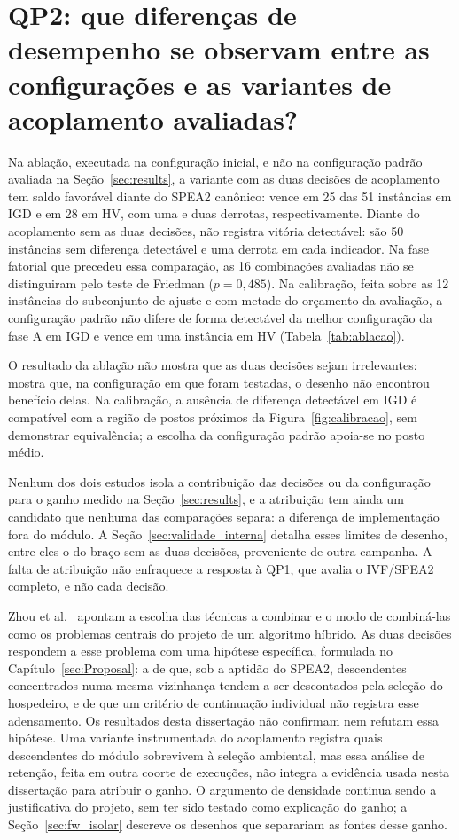 \section{QP2: que diferenças de desempenho se observam entre as configurações e as variantes de acoplamento avaliadas?}
\label{sec:resposta_qp2}

Na ablação, executada na configuração inicial, e não na configuração padrão avaliada na Seção~\ref{sec:results}, a variante com as duas decisões de acoplamento tem saldo favorável diante do SPEA2 canônico: vence em 25 das 51 instâncias em IGD e em 28 em HV, com uma e duas derrotas, respectivamente. Diante do acoplamento sem as duas decisões, não registra vitória detectável: são 50 instâncias sem diferença detectável e uma derrota em cada indicador. Na fase fatorial que precedeu essa comparação, as 16 combinações avaliadas não se distinguiram pelo teste de Friedman ($p = 0{,}485$). Na calibração, feita sobre as 12 instâncias do subconjunto de ajuste e com metade do orçamento da avaliação, a configuração padrão não difere de forma detectável da melhor configuração da fase A em IGD e vence em uma instância em HV (Tabela~\ref{tab:ablacao}).

O resultado da ablação não mostra que as duas decisões sejam irrelevantes: mostra que, na configuração em que foram testadas, o desenho não encontrou benefício delas. Na calibração, a ausência de diferença detectável em IGD é compatível com a região de postos próximos da Figura~\ref{fig:calibracao}, sem demonstrar equivalência; a escolha da configuração padrão apoia-se no posto médio.

Nenhum dos dois estudos isola a contribuição das decisões ou da configuração para o ganho medido na Seção~\ref{sec:results}, e a atribuição tem ainda um candidato que nenhuma das comparações separa: a diferença de implementação fora do módulo. A Seção~\ref{sec:validade_interna} detalha esses limites de desenho, entre eles o do braço sem as duas decisões, proveniente de outra campanha. A falta de atribuição não enfraquece a resposta à QP1, que avalia o IVF/SPEA2 completo, e não cada decisão.

Zhou et al.~\cite{zhou2011multiobjective} apontam a escolha das técnicas a combinar e o modo de combiná-las como os problemas centrais do projeto de um algoritmo híbrido. As duas decisões respondem a esse problema com uma hipótese específica, formulada no Capítulo~\ref{sec:Proposal}: a de que, sob a aptidão do SPEA2, descendentes concentrados numa mesma vizinhança tendem a ser descontados pela seleção do hospedeiro, e de que um critério de continuação individual não registra esse adensamento. Os resultados desta dissertação não confirmam nem refutam essa hipótese. Uma variante instrumentada do acoplamento registra quais descendentes do módulo sobrevivem à seleção ambiental, mas essa análise de retenção, feita em outra coorte de execuções, não integra a evidência usada nesta dissertação para atribuir o ganho. O argumento de densidade continua sendo a justificativa do projeto, sem ter sido testado como explicação do ganho; a Seção~\ref{sec:fw_isolar} descreve os desenhos que separariam as fontes desse ganho.

